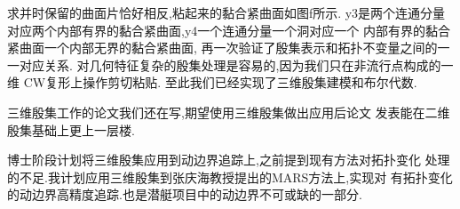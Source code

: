 \documentclass[UTF8]{ctexbeamer}	%
\theoremstyle{plain}
\theoremstyle{definition}
\theoremstyle{remark}
\numberwithin{equation}{section}
\begin{document}
\begin{frame}
  求并时保留的曲面片恰好相反,粘起来的黏合紧曲面如图f所示.
  y3是两个连通分量对应两个内部有界的黏合紧曲面,y4一个连通分量一个洞对应一个
  内部有界的黏合紧曲面一个内部无界的黏合紧曲面,
  再一次验证了殷集表示和拓扑不变量之间的一一对应关系.
  对几何特征复杂的殷集处理是容易的,因为我们只在非流行点构成的一维
  CW复形上操作剪切粘贴.
  至此我们已经实现了三维殷集建模和布尔代数.
\end{frame}

\begin{frame}
  三维殷集工作的论文我们还在写,期望使用三维殷集做出应用后论文
  发表能在二维殷集基础上更上一层楼.
\end{frame}

\begin{frame}
  博士阶段计划将三维殷集应用到动边界追踪上,之前提到现有方法对拓扑变化
  处理的不足.我计划应用三维殷集到张庆海教授提出的MARS方法上,实现对
  有拓扑变化的动边界高精度追踪.也是潜艇项目中的动边界不可或缺的一部分.
\end{frame}

\end{document}
